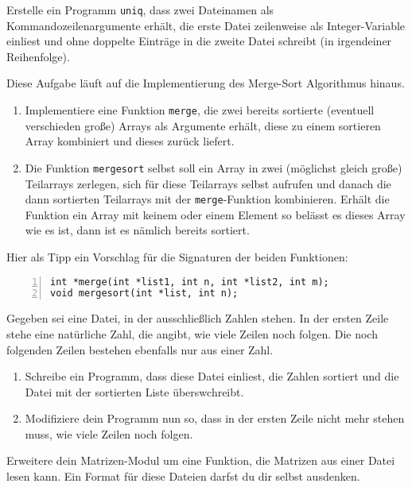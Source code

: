 \documentclass{uebungszettel}
\begin{document}
\begin{aufg}
Erstelle ein Programm \verb|uniq|, dass zwei Dateinamen als Kommandozeilenargumente erhält, die erste Datei zeilenweise 
als Integer-Variable einliest und ohne doppelte Einträge in die zweite Datei schreibt (in irgendeiner Reihenfolge).
\end{aufg}

\begin{aufg}
Diese Aufgabe läuft auf die Implementierung des Merge-Sort Algorithmus hinaus.
\begin{enumerate}
\item Implementiere eine Funktion \verb|merge|, die zwei bereits sortierte (eventuell verschieden große) Arrays als 
Argumente erhält, diese zu einem sortieren Array kombiniert und dieses zurück liefert. 
\item Die Funktion \verb|mergesort| selbst soll ein Array in zwei (möglichst gleich große) Teilarrays zerlegen, sich 
für diese Teilarrays selbst aufrufen und danach die dann sortierten Teilarrays mit der \verb|merge|-Funktion 
kombinieren. Erhält die Funktion ein Array mit keinem oder einem Element so belässt es dieses Array wie es ist, 
dann ist es nämlich bereits sortiert.
\end{enumerate}

Hier als Tipp ein Vorschlag für die Signaturen der beiden Funktionen:
\begin{codelisting}
\begin{lstlisting}[numbers=left,numberstyle=\tiny,frame=tlrb]
int *merge(int *list1, int n, int *list2, int m);
void mergesort(int *list, int n);
\end{lstlisting}
\end{codelisting}
\end{aufg}

\begin{aufg}
Gegeben sei eine Datei, in der ausschließlich Zahlen stehen. In der ersten Zeile stehe eine natürliche Zahl, die 
angibt, wie viele Zeilen noch folgen. Die noch folgenden Zeilen bestehen ebenfalls nur aus einer Zahl. 
\begin{enumerate}
\item Schreibe ein Programm, dass diese Datei einliest, die Zahlen sortiert und die Datei mit der sortierten Liste 
überswchreibt.
\item Modifiziere dein Programm nun so, dass in der ersten Zeile nicht mehr stehen muss, wie viele Zeilen noch folgen.
\end{enumerate}
\end{aufg}

\begin{aufg} Erweitere dein Matrizen-Modul um eine Funktion, die Matrizen aus einer Datei lesen kann. Ein Format für 
diese Dateien darfst du dir selbst ausdenken.
\end{aufg}
\end{document}
